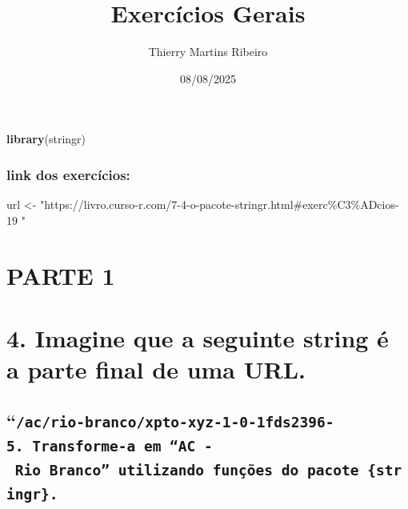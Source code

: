 \documentclass[
]{article}
\title{Exercícios Gerais}
\author{Thierry Martins Ribeiro}
\date{08/08/2025}
\newenvironment{Shaded}{\begin{snugshade}}{\end{snugshade}}
\newcommand{\FunctionTok}[1]{\textcolor[rgb]{0.13,0.29,0.53}{\textbf{#1}}}
\newcommand{\NormalTok}[1]{#1}
\newcommand{\OtherTok}[1]{\textcolor[rgb]{0.56,0.35,0.01}{#1}}
\newcommand{\StringTok}[1]{\textcolor[rgb]{0.31,0.60,0.02}{#1}}
\begin{document}
\maketitle

\begin{Shaded}
\begin{Highlighting}[]
\FunctionTok{library}\NormalTok{(stringr)}
\end{Highlighting}
\end{Shaded}

\subsubsection{link dos exercícios:}\label{link-dos-exercuxedcios}

\begin{Shaded}
\begin{Highlighting}[]
\NormalTok{url }\OtherTok{\textless{}{-}} \StringTok{"https://livro.curso{-}r.com/7{-}4{-}o{-}pacote{-}stringr.html\#exerc\%C3\%ADcios{-}19 "}
\end{Highlighting}
\end{Shaded}

\section{PARTE 1}\label{parte-1}

\section{4. Imagine que a seguinte string é a parte final de uma
URL.}\label{imagine-que-a-seguinte-string-uxe9-a-parte-final-de-uma-url.}

\subsection{\texorpdfstring{``\texttt{/ac/rio-branco/xpto-xyz-1-0-1fds2396-5.\textasciigrave{}\textasciigrave{}\textasciigrave{}\ Transforme-a\ em\ “AC\ -\ Rio\ Branco”\ utilizando\ funções\ do\ pacote\ \{stringr\}.}}{``/ac/rio-branco/xpto-xyz-1-0-1fds2396-5.``` Transforme-a em ``AC - Rio Branco'' utilizando funções do pacote \{stringr\}.}}\label{acrio-brancoxpto-xyz-1-0-1fds2396-5.-transforme-a-em-ac---rio-branco-utilizando-funuxe7uxf5es-do-pacote-stringr.}
\end{document}
